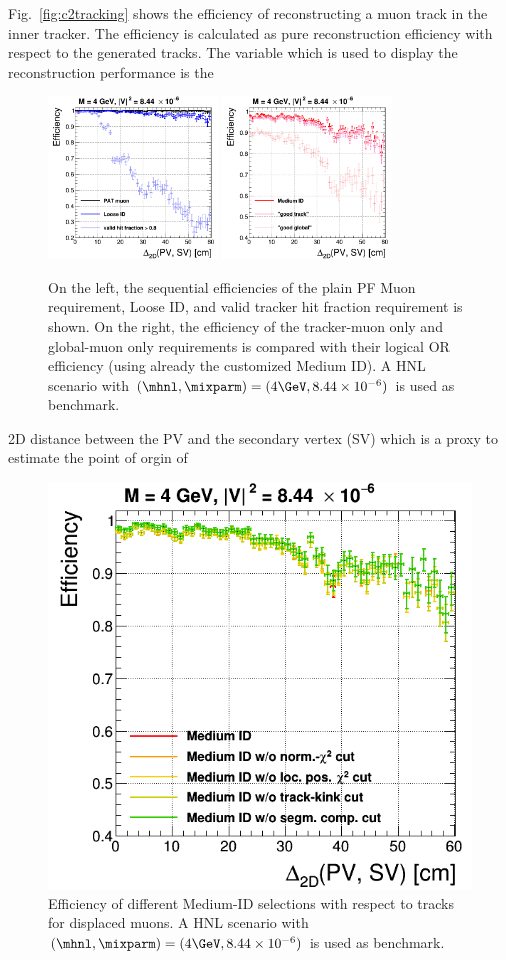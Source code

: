 Fig.~\ref{fig:c2tracking} shows the efficiency of
reconstructing a muon track in the inner tracker. The efficiency is
calculated as pure reconstruction efficiency with respect to the
generated tracks. The variable which is used to display the reconstruction
performance is the 
\begin{figure}[h]
\centering
  \includegraphics[width=0.4\textwidth]{Figures/c6/object/loose_validFraction_M-4_V-0p00290516780927_rho.png}
  \includegraphics[width=0.4\textwidth]{Figures/c6/object/goodTrack_goodGlobal_M-4_V-0p00290516780927_rho.png}
  \caption{On the left, the sequential
efficiencies of the plain PF Muon requirement, Loose ID, and
valid tracker hit fraction requirement is shown. On the right, the efficiency of the tracker-muon only and
    global-muon only requirements is compared with their logical OR
    efficiency (using already the customized Medium ID). A HNL scenario with
    $(\mhnl,\mixparm)=(4\GeV,8.44\times10^{-6})$ is used as
    benchmark. \dani}
  \label{fig:c2tracking2}
\end{figure}
2D distance between the PV and the secondary vertex (SV)
which is a proxy to estimate the point of orgin of
\begin{figure}
\includegraphics[width=.4\textwidth]{Figures/c6/object/globalTrack_cuts_M-4_V-0p00290516780927_rho.png}
  \caption{Efficiency of different Medium-ID selections with respect to tracks for displaced
muons. A HNL scenario with
    $(\mhnl,\mixparm)=(4\GeV,8.44\times10^{-6})$ is used as
    benchmark. \dani}
  \label{fig:c2tracking3}
\end{figure} 
